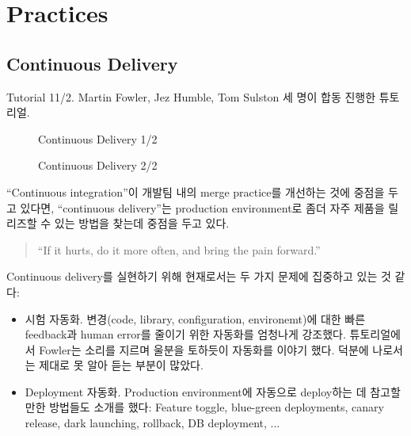 \documentclass[11pt]{article}
\begin{document}
\section{Practices}

\subsection{Continuous Delivery}
Tutorial 11/2.
Martin Fowler, Jez Humble, Tom Sulston 세 명이 합동 진행한 튜토리얼.
%

\begin{figure}[t]
    \begin{Frame}
        \begin{center}
        \end{center}
    \end{Frame}
    \caption{Continuous Delivery 1/2}
    \label{Continuous Delivery 1}
\end{figure}

\begin{figure}[t]
    \begin{Frame}
        \begin{center}
        \end{center}
    \end{Frame}
    \caption{Continuous Delivery 2/2}
    \label{Continuous Delivery 2}
\end{figure}

``Continuous integration''이 개발팀 내의 merge practice를 개선하는 것에
중점을 두고 있다면, ``continuous delivery''\cite{hufa10}는 
production environment로 좀더 자주 제품을 릴리즈할 수 있는 방법을 찾는데 
중점을 두고 있다.

\begin{quote}
``If it hurts, do it more often, and bring the pain forward.''  
\end{quote}

Continuous delivery를 실현하기 위해 현재로서는 두 가지 문제에 집중하고 있는 
것 같다:
\begin{itemize}
\item 시험 자동화.  변경(code, library, configuration, environemt)에 대한 빠른 feedback과
human error를 줄이기 위한 자동화를 엄청나게 강조했다. 튜토리얼에서 Fowler는
소리를 지르며 울분을 토하듯이 자동화를 이야기 했다. 덕분에 나로서는 
제대로 못 알아 듣는 부분이 많았다.

\item Deployment 자동화. Production environment에 자동으로 deploy하는 데 참고할 만한 방법들도 소개를
했다: Feature toggle, blue-green deployments, canary release, dark launching,
rollback, DB deployment, ...
\end{itemize}
\end{document}
